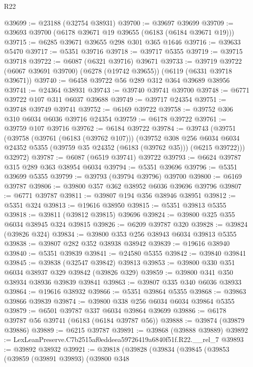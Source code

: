 \begin{lexlean}{R22}
\begin{coremodule}
@39699 := @23188 (@32754 @38931)
@39700 := @39697 @39699
@39709 := @39693 @39700 (@6178 @39671 @19 @39655 (@6183 (@6184 @39671 @19)))
@39715 := @6285 @39671 @39655 @298 @301 @365 @1646
@39716 := @39633 @5470
@39717 := @5351 @39716
@39718 := @39717 @5355
@39719 := @39715 @39718
@39722 := @6087 (@6321 @39716) @39671
@39733 := @39719 @39722 (@6067 @39691 @39700) (@6278 (@19742 @39655)) (@6119 (@6331 @39718 @39671))
@39740 := @6458 @39722 @56 @289 @312 @364 @39689 @38956
@39741 := @24364 @38931
@39743 := @39740 @39741 @39700
@39748 := @6771 @39722 @107 @311 @6037 @39688
@39749 := @39717 @24354
@39751 := @39748 @39749 @39741
@39752 := @6169 @39722
@39758 := @39752 @306 @310 @6034 @6036 @39716 @24354
@39759 := @6178 @39722
@39761 := @39759 @107 @39716
@39762 := @6184 @39722
@39784 := @39743
    (@39751
      (@39758
        (@39761 (@6183 (@39762 @107)))
        (@39752
          @308
          @256
          @6034
          @6034
          @24352
          @5355
          (@39759 @35 @24352 (@6183 (@39762 @35)))
          (@6215 @39722)))
      @32972)
@39787 := @6087 (@6519 @39741) @39722
@39793 := @6624 @39787 @315 @289 @363 @38954 @6034
@39794 := @5351 @39696
@39796 := @5351 @39699 @5355
@39799 := @39793 (@39794 @39796) @39700
@39800 := @6169 @39787
@39806 := @39800 @357 @362 @38952 @6036 @39696 @39796
@39807 := @6771 @39787
@39811 := @39807 @194 @356 @38946 @38951
@39812 := @5351 @324
@39813 := @19616 @38950
@39815 := @5351 @39813 @5355
@39818 := @39811 (@39812 @39815) @39696
@39824 := @39800 @325 @355 @6034 @38945 @324 @39815
@39826 := @6209 @39787 @320
@39828 := @39824 (@39826 @324)
@39834 := @39800 @353 @256 @38943 @6034 @39813 @5355
@39838 := @39807 @282 @352 @38938 @38942
@39839 := @19616 @38940
@39840 := @5351 @39839
@39841 := @24580 @5355
@39842 := @39840 @39841
@39845 := @39838 (@32547 @39842) @39813
@39853 := @39800 @330 @351 @6034 @38937 @329 @39842 (@39826 @329)
@39859 := @39800 @341 @350 @38934 @38936 @39839 @39841
@39863 := @39807 @335 @340 @6036 @38933
@39864 := @19616 @38932
@39866 := @5351 @39864 @5355
@39868 := @39863 @39866 @39839
@39874 := @39800 @338 @256 @6034 @6034 @39864 @5355
@39879 := @6501 @39787 @337 @6034 @39864 @39699
@39886 := @6178 @39787 @56 @39741 (@6183 (@6184 @39787 @56))
@39888 := @39874 (@39879 @39886)
@39889 := @6215 @39787
@39891 := @39868 (@39888 @39889)
@39892 := LexLeanPreserve.C7b2515af0eddeea59726419a6840f51f.R22.__rel_7
@39893 := @39892 @38932
@39921 := @39818
    (@39828
      (@39834
        (@39845
          (@39853
            (@39859
              (@39891 @39893)
              (@39800
                @348

\end{coremodule}
\end{lexlean}
